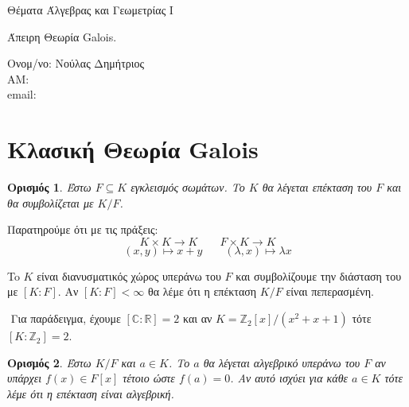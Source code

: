 \documentclass[oneside,a4paper]{article}
\newtheorem*{defn}{Ορισμός}
\newcommand {\tl}{\textlatin}
\newcommand{\Z}{\mathbb{Z}}
\begin{document}
	
	
	\begin{framed}	
		\begin{center}
			\huge Θέματα Άλγεβρας και Γεωμετρίας \tl{I}
		\end{center}
		\begin{center}
			\huge Άπειρη Θεωρία \tl{Galois}.
		\end{center}
		\vspace{0.3truecm}
		\begin{center}
			Ονομ/νο: Νούλας Δημήτριος\\
			ΑΜ: \\
			\tl{email}: \tl{}
		\end{center}
		\vspace{0.3truecm}
	\end{framed}
\vspace{1cm}
\pagebreak
\tableofcontents
\pagebreak
\section{Κλασική Θεωρία \tl{Galois}}
\vspace{1cm}

\begin{defn}
	Έστω $F\subseteq K$ εγκλεισμός σωμάτων. Το $K$ θα λέγεται επέκταση του $F$ και θα συμβολίζεται με $K/F$.
\end{defn}

Παρατηρούμε ότι με τις πράξεις:
$$K\times K \longrightarrow K \quad\quad F \times K \longrightarrow K$$
$$(x,y) \longmapsto x+y \quad\quad (\lambda, x) \longmapsto \lambda x$$

To $K$ είναι διανυσματικός χώρος υπεράνω του $F$ και συμβολίζουμε την διάσταση του με $[K:F]$. Αν $[K:F]<\infty$ θα λέμε ότι η επέκταση $K/F$ είναι πεπερασμένη.

$ $\newline
Για παράδειγμα, έχουμε $[\mathbb C : \mathbb R] = 2$ και αν $K = \Z_2 [x]/(x^2 + x + 1)$ τότε $[K:\Z_2] = 2$.

\begin{defn}
	Έστω $K/F$ και $a \in K$. Το $a$ θα λέγεται αλγεβρικό υπεράνω του $F$ αν υπάρχει $f(x) \in F[x]$ τέτοιο ώστε $f(a)=0$. Αν αυτό ισχύει για κάθε $a \in K$ τότε λέμε ότι η επέκταση είναι αλγεβρική.
\end{defn}
\end{document}
